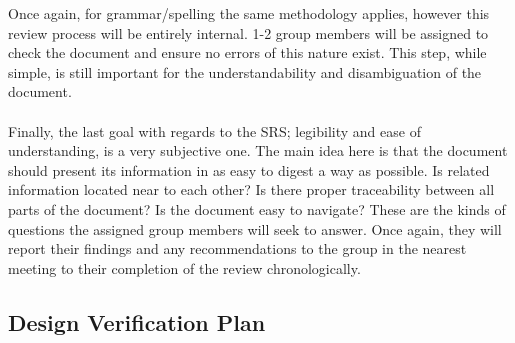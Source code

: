 \documentclass[12pt, titlepage]{article}
\begin{document}
Once again, for grammar/spelling the same methodology applies, however this review process will be entirely internal. 1-2 group members will be assigned to 
check the document and ensure no errors of this nature exist. This step, while simple, is still important for the understandability and disambiguation of the document.\\\\
Finally, the last goal with regards to the SRS; legibility and ease of understanding, is a very subjective one. The main idea here is that the document should present 
its information in as easy to digest a way as possible. Is related information located near to each other? Is there proper traceability between all parts of the document? 
Is the document easy to navigate? These are the kinds of questions the assigned group members will seek to answer. Once again, they will report their findings and any 
recommendations to the group in the nearest meeting to their completion of the review chronologically.

\subsection{Design Verification Plan}
\end{document}

